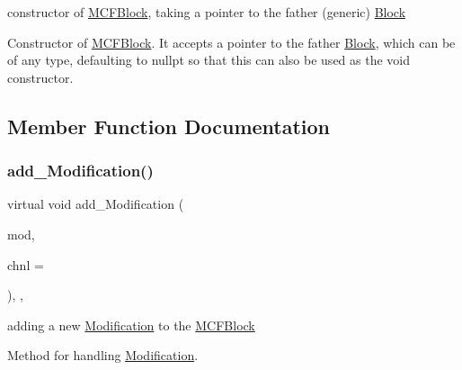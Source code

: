 constructor of \mbox{\hyperlink{class_s_m_spp__di__unipi__it_1_1_m_c_f_block}{M\+C\+F\+Block}}, taking a pointer to the father (generic) \mbox{\hyperlink{class_s_m_spp__di__unipi__it_1_1_block}{Block}} 

Constructor of \mbox{\hyperlink{class_s_m_spp__di__unipi__it_1_1_m_c_f_block}{M\+C\+F\+Block}}. It accepts a pointer to the father \mbox{\hyperlink{class_s_m_spp__di__unipi__it_1_1_block}{Block}}, which can be of any type, defaulting to nullpt so that this can also be used as the void constructor. 

\subsection{Member Function Documentation}
\mbox{\label{class_s_m_spp__di__unipi__it_1_1_m_c_f_block_a2d7dffba0c9fd17de24549e0f1a4c760}} 
\subsubsection{\texorpdfstring{add\+\_\+\+Modification()}{add\_Modification()}}
{\footnotesize\ttfamily virtual void add\+\_\+\+Modification (\begin{DoxyParamCaption}\item[{\mbox{\hyperlink{group___modification___t_y_p_e_s_ga9024cf2ead61a1280d29771b063b1a62}{sp\+\_\+\+Mod}}}]{mod,  }\item[{\mbox{\hyperlink{class_s_m_spp__di__unipi__it_1_1_observer_a54ce8db639626e45b1f20c289baa989b}{Chnl\+Name}}}]{chnl = {} }\end{DoxyParamCaption})\hspace{0.3cm}{\ttfamily [final]}, {\ttfamily [override]}, {\ttfamily [virtual]}}



adding a new \mbox{\hyperlink{class_s_m_spp__di__unipi__it_1_1_modification}{Modification}} to the \mbox{\hyperlink{class_s_m_spp__di__unipi__it_1_1_m_c_f_block}{M\+C\+F\+Block}} 

Method for handling \mbox{\hyperlink{class_s_m_spp__di__unipi__it_1_1_modification}{Modification}}.

